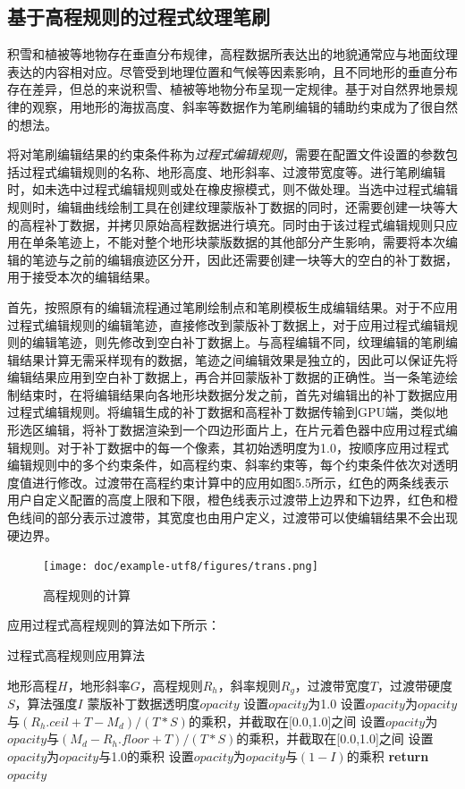 \subsection{基于高程规则的过程式纹理笔刷}
积雪和植被等地物存在垂直分布规律，高程数据所表达出的地貌通常应与地面纹理表达的内容相对应。尽管受到地理位置和气候等因素影响，且不同地形的垂直分布存在差异，但总的来说积雪、植被等地物分布呈现一定规律。基于对自然界地景规律的观察，用地形的海拔高度、斜率等数据作为笔刷编辑的辅助约束成为了很自然的想法。\par
将对笔刷编辑结果的约束条件称为\textit{过程式编辑规则}，需要在配置文件设置的参数包括过程式编辑规则的名称、地形高度、地形斜率、过渡带宽度等。进行笔刷编辑时，如未选中过程式编辑规则或处在橡皮擦模式，则不做处理。当选中过程式编辑规则时，编辑曲线绘制工具在创建纹理蒙版补丁数据的同时，还需要创建一块等大的高程补丁数据，并拷贝原始高程数据进行填充。同时由于该过程式编辑规则只应用在单条笔迹上，不能对整个地形块蒙版数据的其他部分产生影响，需要将本次编辑的笔迹与之前的编辑痕迹区分开，因此还需要创建一块等大的空白的补丁数据，用于接受本次的编辑结果。\par
首先，按照原有的编辑流程通过笔刷绘制点和笔刷模板生成编辑结果。对于不应用过程式编辑规则的编辑笔迹，直接修改到蒙版补丁数据上，对于应用过程式编辑规则的编辑笔迹，则先修改到空白补丁数据上。与高程编辑不同，纹理编辑的笔刷编辑结果计算无需采样现有的数据，笔迹之间编辑效果是独立的，因此可以保证先将编辑结果应用到空白补丁数据上，再合并回蒙版补丁数据的正确性。当一条笔迹绘制结束时，在将编辑结果向各地形块数据分发之前，首先对编辑出的补丁数据应用过程式编辑规则。将编辑生成的补丁数据和高程补丁数据传输到GPU端，类似地形选区编辑，将补丁数据渲染到一个四边形面片上，在片元着色器中应用过程式编辑规则。对于补丁数据中的每一个像素，其初始透明度为1.0，按顺序应用过程式编辑规则中的多个约束条件，如高程约束、斜率约束等，每个约束条件依次对透明度值进行修改。过渡带在高程约束计算中的应用如图5.5所示，红色的两条线表示用户自定义配置的高度上限和下限，橙色线表示过渡带上边界和下边界，红色和橙色线间的部分表示过渡带，其宽度也由用户定义，过渡带可以使编辑结果不会出现硬边界。
\begin{figure}[H]
    \centering
    \texttt{[image: doc/example-utf8/figures/trans.png]}
    \caption{高程规则的计算}
 \end{figure}
应用过程式高程规则的算法如下所示：\par
 \begin{algorithm}[H]
	\renewcommand{\algorithmicrequire}{\textbf{Input:}}
	\renewcommand{\algorithmicensure}{\textbf{Output:}}
	\caption{过程式高程规则应用算法}
	\label{alg:1}
	\begin{algorithmic}[1]
		\REQUIRE 地形高程$H$，地形斜率$G$，高程规则$R_h$，斜率规则$R_g$，过渡带宽度$T$，过渡带硬度$S$，算法强度$I$
		\ENSURE 蒙版补丁数据透明度$opacity$
		\STATE 设置$opacity$为1.0
	    \STATE 设置$opacity$为$opacity$与$(R_h.ceil+T-M_d)/(T*S)$的乘积，并截取在[0.0,1.0]之间
	    \ELSE 
	    \STATE 设置$opacity$为$opacity$与$(M_d-R_h.floor+T)/(T*S)$的乘积，并截取在[0.0,1.0]之间
		\ENDIF
	    \STATE 设置$opacity$为$opacity$与1.0的乘积
	    \ELSE 
	    \STATE 设置$opacity$为$opacity$与$(1-I)$的乘积
		\ENDIF
		\STATE \textbf{return} $opacity$
	\end{algorithmic}  
\end{algorithm}
